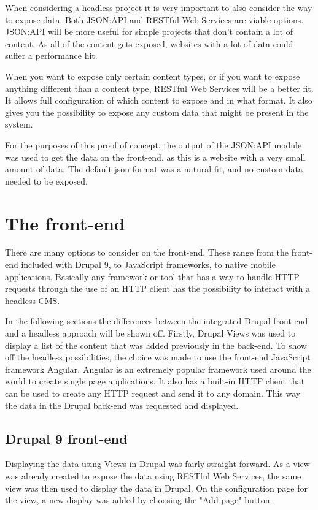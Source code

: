 When considering a headless project it is very important to also consider the way to expose data. Both JSON:API and RESTful Web Services are viable options. JSON:API will be more useful for simple projects that don't contain a lot of content. As all of the content gets exposed, websites with a lot of data could suffer a performance hit.

When you want to expose only certain content types, or if you want to expose anything different than a content type, RESTful Web Services will be a better fit. It allows full configuration of which content to expose and in what format. It also gives you the possibility to expose any custom data that might be present in the system.

For the purposes of this proof of concept, the output of the JSON:API module was used to get the data on the front-end, as this is a website with a very small amount of data. The default json format was a natural fit, and no custom data needed to be exposed. 

\section{The front-end}

There are many options to consider on the front-end. These range from the front-end included with Drupal 9, to JavaScript frameworks, to native mobile applications. Basically any framework or tool that has a way to handle HTTP requests through the use of an HTTP client has the possibility to interact with a headless CMS. 

In the following sections the differences between the integrated Drupal front-end and a headless approach will be shown off. Firstly, Drupal Views was used to display a list of the content that was added previously in the back-end. To show off the headless possibilities, the choice was made to use the front-end JavaScript framework Angular. Angular is an extremely popular framework used around the world to create single page applications. It also has a built-in HTTP client that can be used to create any HTTP request and send it to any domain. This way the data in the Drupal back-end was requested and displayed.

\subsection{Drupal 9 front-end}

Displaying the data using Views in Drupal was fairly straight forward. As a view was already created to expose the data using RESTful Web Services, the same view was then used to display the data in Drupal. On the configuration page for the view, a new display was added by choosing the "Add page" button. 

